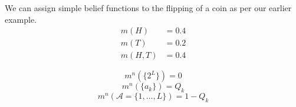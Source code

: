 {{%
}
\begin{example}
\label{eq:coin1}
We can assign simple belief functions to the flipping of a coin as per our earlier example.
\begin{align*}
m({H}) &= 0.4\\
m({T}) &= 0.2\\
m({H,T}) &= 0.4
\end{align*}
\end{example}


\begin{equation}
m^{n}(\{2^{L}\}) = 0
\end{equation}
\begin{equation}
\label{eq:mass1}
m^{n}(\{a_{k}\}) = Q_{k}
\end{equation}
\begin{equation}
\label{eq:mass2}
m^{n}(\mathcal{A}=\{1,\dots,L\}) = 1-Q_{k}
\end{equation}

}
